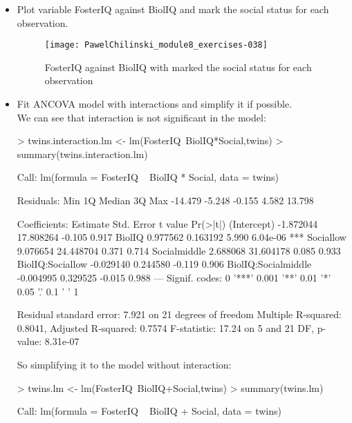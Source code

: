 \documentclass[a4paper]{article}
\begin{document}
\begin{itemize}
  \item  Plot variable FosterIQ  against BiolIQ  and mark the social status for
  each observation.
 
\begin{figure}[H]
\begin{center}
\texttt{[image: PawelChilinski\_module8\_exercises-038]}
\caption{FosterIQ  against BiolIQ with marked the social status for
  each observation}
\end{center}
\end{figure}

\item Fit ANCOVA model with interactions and simplify it if possible.\\

We can see that interaction is not significant in the model:
\begin{Schunk}
\begin{Sinput}
> twins.interaction.lm <- lm(FosterIQ~BiolIQ*Social,twins)
> summary(twins.interaction.lm)
\end{Sinput}
\begin{Soutput}
Call:
lm(formula = FosterIQ ~ BiolIQ * Social, data = twins)

Residuals:
    Min      1Q  Median      3Q     Max 
-14.479  -5.248  -0.155   4.582  13.798 

Coefficients:
                     Estimate Std. Error t value Pr(>|t|)    
(Intercept)         -1.872044  17.808264  -0.105    0.917    
BiolIQ               0.977562   0.163192   5.990 6.04e-06 ***
Sociallow            9.076654  24.448704   0.371    0.714    
Socialmiddle         2.688068  31.604178   0.085    0.933    
BiolIQ:Sociallow    -0.029140   0.244580  -0.119    0.906    
BiolIQ:Socialmiddle -0.004995   0.329525  -0.015    0.988    
---
Signif. codes:  0 '***' 0.001 '**' 0.01 '*' 0.05 '.' 0.1 ' ' 1

Residual standard error: 7.921 on 21 degrees of freedom
Multiple R-squared:  0.8041,	Adjusted R-squared:  0.7574 
F-statistic: 17.24 on 5 and 21 DF,  p-value: 8.31e-07
\end{Soutput}
\end{Schunk}

So simplifying it to the model without interaction:
\begin{Schunk}
\begin{Sinput}
> twins.lm <- lm(FosterIQ~BiolIQ+Social,twins)
> summary(twins.lm)
\end{Sinput}
\begin{Soutput}
Call:
lm(formula = FosterIQ ~ BiolIQ + Social, data = twins)


\end{Soutput}
\end{Schunk}
\end{itemize}
\end{document}
